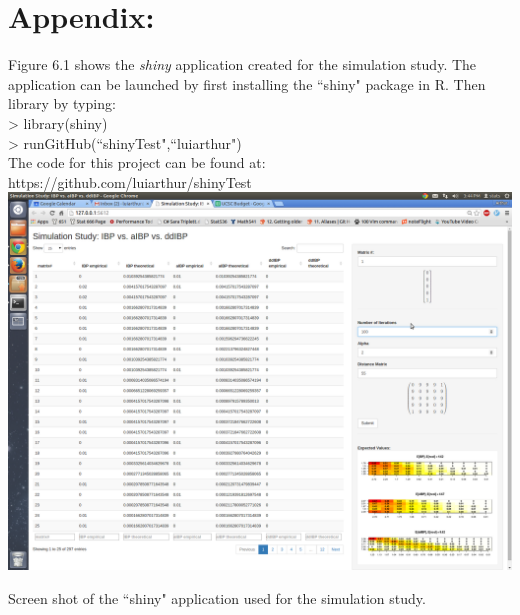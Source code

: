 \chapter{Appendix:}
Figure 6.1 shows the \textit{shiny} application created for the simulation study.
The application can be launched by first installing the ``shiny" package in R. 
Then library by typing:\\
> library(shiny) \\
> runGitHub(``shinyTest",``luiarthur")\\
\noindent
The code for this project can be found at:\\
https://github.com/luiarthur/shinyTest\\
\beginmyfig
  \includegraphics{images/shiny.png}
  \caption{Screen shot of the ``shiny" application used for the simulation study.}
\endmyfig


